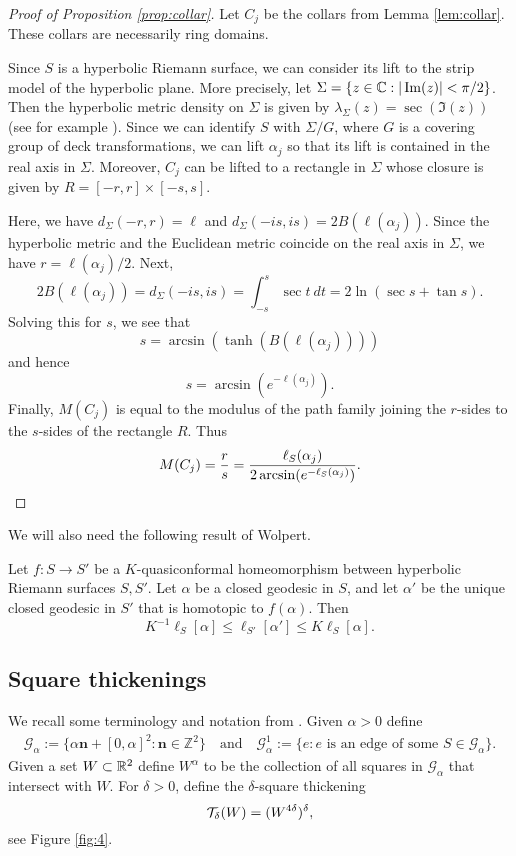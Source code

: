 \documentclass{amsart}
\begin{document}
\begin{proof}[Proof of Proposition \ref{prop:collar}]
Let $C_j$ be the collars from Lemma \ref{lem:collar}. These collars are necessarily ring domains.

Since $S$ is a hyperbolic Riemann surface, we can consider its lift to the strip model of the hyperbolic plane. More precisely, let $\Sigma = \{ z\in \mathbb{C} : | \operatorname{Im}(z)| <\pi /2 \}$. Then the hyperbolic metric density on $\Sigma$ is given by $\lambda_{\Sigma}(z) = \sec (\Im (z) )$ (see for example \cite[Example 7.9]{BM}). Since we can identify $S$ with $\Sigma / G$, where $G$ is a covering group of deck transformations, we can lift $\alpha_j$ so that its lift is contained in the real axis in $\Sigma$. Moreover, $C_j$ can be lifted to a rectangle in $\Sigma$ whose closure is given by $R = [-r,r] \times [-s, s]$.

Here, we have $d_{\Sigma} (-r , r) = \ell$ and $d_{\Sigma}(-is , is ) = 2 B(\ell(\alpha_j) )$. Since the hyperbolic metric and the Euclidean metric coincide on the real axis in $\Sigma$, we have $r=\ell(\alpha_j) / 2$. Next,
\[2 B(\ell(\alpha_j)) = d_{\Sigma}(-is, is) = \int_{-s}^s \sec t \: dt = 2 \ln (\sec s +\tan s).\]
Solving this for $s$, we see that
\[ s = \arcsin ( \tanh (B(\ell(\alpha_j))))\]
and hence
\[ s = \arcsin ( e^{-\ell(\alpha_j)} ).\]
Finally, $M(C_j)$ is equal to the modulus of the path family joining the $r$-sides to the $s$-sides of the rectangle $R$. Thus
\[ M(C_j) = \frac{r}{s} = \frac{\ell_S(\alpha_j)}{2\arcsin ( e^{-\ell_S(\alpha_j)} )} . \qedhere\]
\end{proof}

We will also need the following result of Wolpert.

\begin{lemma}
\label{thm:wolpert}
Let $f:S \to S'$ be a $K$-quasiconformal homeomorphism between hyperbolic Riemann surfaces $S,S'$. Let $\alpha$ be a closed geodesic in $S$, and let $\alpha'$ be the unique closed geodesic in $S'$ that is homotopic to $f(\alpha)$. Then
\[ K^{-1}\ell_S[ \alpha ] \leq \ell_{S'} [ \alpha' ] \leq K \ell_S [ \alpha ].\]
\end{lemma}


\subsection{Square thickenings}

We recall some terminology and notation from \cite{MM2}. Given $\alpha>0$ define 
\begin{align*} 
\mathscr{G}_{\alpha} := \{ \alpha\textbf{n} + [0,\alpha]^2 : \textbf{n} \in \mathbb{Z}^2 \}\quad\text{and}\quad  \mathscr{G}_{\alpha}^1 := \{e : \text{$e$ is an edge of some $S\in \mathscr{G}_{\alpha}$} \}.
\end{align*}
Given a set $W \subset \mathbb{R}^2$ define $W^{\alpha}$ to be the collection of all squares in $\mathscr{G}_{\alpha}$ that intersect with $W$. For $\delta>0$, define the $\delta$-square thickening
\[ \mathcal{T}_{\delta}(W) = (W^{4\delta})^{\delta},\] 
see Figure \ref{fig:4}.
\end{document}
